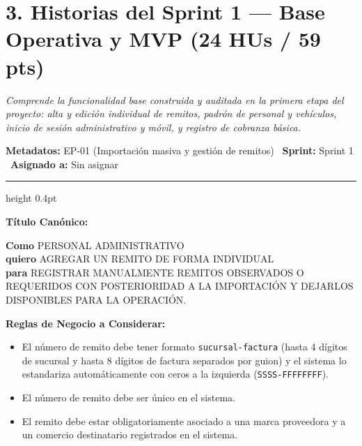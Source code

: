\documentclass[a4paper,9pt]{article}
\begin{document}
\newpage
\section{3. Historias del Sprint 1 — Base Operativa y MVP (24 HUs / 59 pts)}
\noindent\textit{Comprende la funcionalidad base construida y auditada en la primera etapa del proyecto: alta y edición individual de remitos, padrón de personal y vehículos, inicio de sesión administrativo y móvil, y registro de cobranza básica.}
\vspace{4pt}

\begin{tcolorbox}[hucard, title={\textbf{HU-4: AGREGAR UN REMITO} \hfill \scriptsize \colorbox{tealstatus}{\textbf{\ Accepted\ }} \quad \colorbox{white}{\textcolor{primarydark}{\textbf{\ 3 pts\ }}}}]
\vspace{-1pt}
\noindent\textbf{\footnotesize Metadatos:} EP-01 (Importación masiva y gestión de remitos) \textbar\ \textbf{Sprint:} Sprint 1 \textbar\ \textbf{Asignado a:} Sin asignar\par\vspace{2pt}
\hrule height 0.4pt\par\vspace{3pt}
\noindent\textbf{\footnotesize Título Canónico:}\par\vspace{1pt}
{\small \textbf{Como} PERSONAL ADMINISTRATIVO \\ \textbf{quiero} AGREGAR UN REMITO DE FORMA INDIVIDUAL \\ \textbf{para} REGISTRAR MANUALMENTE REMITOS OBSERVADOS O REQUERIDOS CON POSTERIORIDAD A LA IMPORTACIÓN Y DEJARLOS DISPONIBLES PARA LA OPERACIÓN.}\par\vspace{3pt}
\noindent\textbf{\footnotesize Reglas de Negocio a Considerar:}\par\vspace{1pt}
{\footnotesize
\begin{itemize}[leftmargin=12pt, nosep, itemsep=1.5pt, topsep=1pt]
\item El número de remito debe tener formato \texttt{sucursal-factura} (hasta 4 dígitos de sucursal y hasta 8 dígitos de factura separados por guion) y el sistema lo estandariza automáticamente con ceros a la izquierda (\texttt{SSSS-FFFFFFFF}).
\item El número de remito debe ser único en el sistema.
\item El remito debe estar obligatoriamente asociado a una marca proveedora y a un comercio destinatario registrados en el sistema.

\end{itemize}}
\end{tcolorbox}
\end{document}
